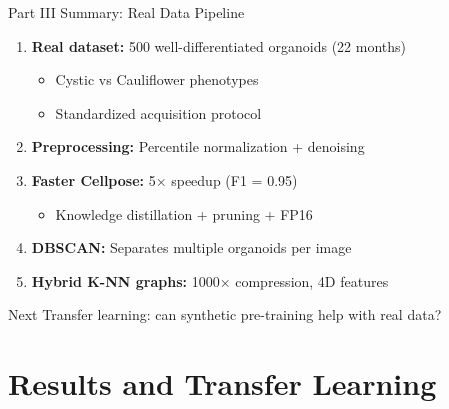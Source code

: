 \documentclass[aspectratio=169]{beamer}
\begin{document}
\begin{frame}{Part III Summary: Real Data Pipeline}
    \begin{enumerate}
        \item \textbf{Real dataset:} 500 well-differentiated organoids (22 months)
        \begin{itemize}
            \item Cystic vs Cauliflower phenotypes
            \item Standardized acquisition protocol
        \end{itemize}
    
    \vspace{0.3em}
        \item \textbf{Preprocessing:} Percentile normalization + denoising
    
    \vspace{0.3em}
        \item \textbf{Faster Cellpose:} 5× speedup (F1 = 0.95)
        \begin{itemize}
            \item Knowledge distillation + pruning + FP16
        \end{itemize}
    
    \vspace{0.3em}
        \item \textbf{DBSCAN:} Separates multiple organoids per image
    
    \vspace{0.3em}
        \item \textbf{Hybrid K-NN graphs:} 1000× compression, 4D features
    \end{enumerate}
            
    \vspace{0.3em}
    \begin{alertblock}{Next}
        Transfer learning: can synthetic pre-training help with real data?
    \end{alertblock}
\end{frame}

\section{Results and Transfer Learning}
\end{document}
